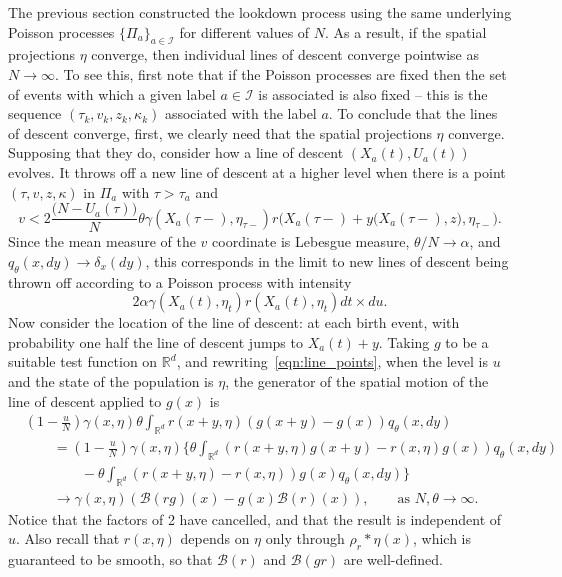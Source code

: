 \documentclass[12pt]{article}
\newcommand{\IR}{\mathbb R}
\newcommand{\DG}{\mathcal{B}}  %
\newcommand{\kernel}{\rho}  %
\newcommand{\smooth}[1]{\kernel_{#1} \! * \!}  %
\newcommand{\labelspace}{\mathcal{I}} %
\numberwithin{equation}{section}
\begin{document}
The previous section constructed the lookdown process
using the same underlying Poisson processes $\{\Pi_a\}_{a \in \labelspace}$ for
different values of $N$.
As a result, if the spatial projections $\eta$ converge, then
individual lines of descent converge pointwise as $N \to \infty$.
To see this, first note that if the Poisson processes are fixed
then the set of events with which a given label $a \in \labelspace$ is associated
is also fixed -- this is the sequence $(\tau_k, v_k, z_k, \kappa_k)$ associated 
with the label $a$.
To conclude that the lines of descent converge, 
first, we clearly need that the spatial projections $\eta$ converge.
%
Supposing that they do,
consider how a line of descent $(X_a(t), U_a(t))$ evolves.
It throws off a new line of descent at a higher level
when there is a point $(\tau, v, z, \kappa)$ in $\Pi_a$ with $\tau > \tau_a$ and
\begin{equation} \label{eqn:line_points}
    v < 2 \frac{\big(N - U_a(\tau)\big)}{N} \theta \gamma(X_a(\tau-), \eta_{\tau-}) 
	r\Big(X_a(\tau-) + y\big(X_a(\tau-),z\big), \eta_{\tau-}\Big) .
\end{equation}
Since the mean measure of the $v$ coordinate is Lebesgue measure,
$\theta/N \to \alpha$,
and $q_\theta(x, dy) \to \delta_x(dy)$,
this corresponds in the limit to new lines of descent being thrown off 
according to a Poisson process with intensity
$$
2 \alpha \gamma(X_a(t), \eta_t) r(X_a(t), \eta_t)dt \times du.
$$
Now consider the location of the line of descent:
at each birth event, with probability one half
the line of descent jumps to $X_a(t) + y$.
Taking $g$ to be a suitable test function on $\IR^d$, 
and rewriting~\eqref{eqn:line_points}, when the level is $u$
and the state of the population is $\eta$, the generator of the
spatial motion of the line of descent
applied to $g(x)$ is
\begin{align*}
    &
    \left(1 - \frac{u}{N}\right) \gamma(x, \eta)
    \theta \int_{\IR^d} r(x+y, \eta) (g(x+y) - g(x)) q_\theta(x, dy) \\
    &\qquad {}
    =
    \left(1 - \frac{u}{N}\right) \gamma(x, \eta)
    \bigg\{
        \theta \int_{\IR^d} (r(x+y, \eta) g(x+y) - r(x, \eta) g(x)) q_\theta(x, dy) \\
        &\qquad \qquad {}
        -
        \theta \int_{\IR^d} (r(x+y, \eta) - r(x, \eta) ) g(x) q_\theta(x, dy) 
    \bigg\} \\
    &\qquad {}
    \to
    \gamma(x, \eta)
    \left(
        \DG(rg)(x) - g(x) \DG(r)(x)
    \right) ,
    \qquad \text{as } N, \theta \to \infty .
\end{align*}
Notice that the factors of 2 have cancelled,
and that the result is independent of $u$.
Also recall that $r(x, \eta)$ depends on $\eta$ only
through $\smooth{r}\eta(x)$,
which is guaranteed to be smooth, so that $\DG(r)$ 
and $\DG(gr)$ are well-defined.
\end{document}
